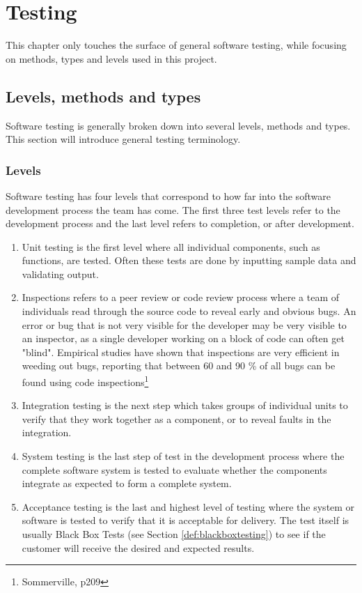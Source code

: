 \chapter{Testing}
This chapter only touches the surface of general software testing, while focusing on methods, types and levels used in this project.
\section{Levels, methods and types}
Software testing is generally broken down into several levels, methods and types. This section will introduce general testing terminology.
\subsection{Levels}
Software testing has four levels that correspond to how far into the software development process the team has come. The first three test levels refer to the development process and the last level refers to completion, or after development.
\begin{enumerate}
\item Unit testing is the first level where all individual components, such as functions, are tested. Often these tests are done by inputting sample data and validating output.
\item Inspections refers to a peer review or code review process where a team of individuals read through the source code to reveal early and obvious bugs. An error or bug that is not very visible for the developer may be very visible to an inspector, as a single developer working on a block of code can often get "blind". Empirical studies have shown that inspections are very efficient in weeding out bugs, reporting that between 60 and 90 \% of all bugs can be found using code inspections\footnote{Sommerville, p209\cite{sommerville}}
\item Integration testing is the next step which takes groups of individual units to verify that they work together as a component, or to reveal faults in the integration.
\item System testing is the last step of test in the development process where the complete software system is tested to evaluate whether the components integrate as expected to form a complete system.
\item Acceptance testing is the last and highest level of testing where the system or software is tested to verify that it is acceptable for delivery. The test itself is usually Black Box Tests (see Section \ref{def:blackboxtesting}) to see if the customer will receive the desired and expected results.
\end{enumerate}
